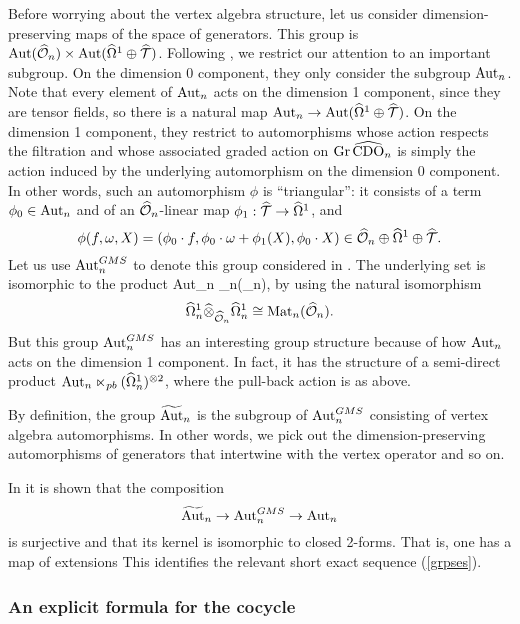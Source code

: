 Before worrying about the vertex algebra structure, let us consider dimension-preserving maps of the space of generators.
This group is $\Aut(\hO_n) \times \Aut(\hOmega^1 \oplus \hT)$.
Following \cite{GMS}, we restrict our attention to an important subgroup.
On the dimension 0 component, they only consider the subgroup $\Aut_n$.
Note that every element of $\Aut_n$ acts on the dimension 1 component, since they are tensor fields,
so there is a natural map $\Aut_n \to \Aut(\hOmega^1 \oplus \hT)$.
On the dimension 1 component, they restrict to automorphisms whose action respects the filtration 
and whose associated graded action on $\Gr\, \hCDO_n$ is simply the action induced by the underlying automorphism on the dimension 0 component.
In other words, such an automorphism $\phi$ is ``triangular'':
it consists of a term $\phi_0 \in \Aut_n$ and of an $\hO_n$-linear map $\phi_1: \hT \to \hOmega^1$,
and 
\[
\phi(f, \omega, X) = (\phi_0 \cdot f, \phi_0 \cdot \omega + \phi_1(X), \phi_0\cdot X) \in \hO_n \oplus \hOmega^1 \oplus \hT.
\]
Let us use $\Aut^{GMS}_n$ to denote this group considered in \cite{GMS}.
The underlying set is isomorphic to the product 
\ben
{\rm Aut}_n _n(\ccO_n),
\een
by using the natural isomorphism 
\[
\hOmega^1_n \widehat{\otimes}_{\hO_n} \hOmega^1_n \cong {\rm Mat}_n(\ccO_n).
\]
But this group $\Aut^{GMS}_n$ has an interesting group structure because of how $\Aut_n$ acts on the dimension 1 component.
In fact, it has the structure of a semi-direct product ${\rm Aut}_n \ltimes_{pb} (\hOmega^1_n)^{\tensor 2}$, where the pull-back action is as above.

By definition, the group $\Tilde{\rm Aut}_n$ is the subgroup of $\Aut^{GMS}_n$ consisting of vertex algebra automorphisms. 
In other words, we pick out the dimension-preserving automorphisms of generators that intertwine with the vertex operator and so on.

In \cite{GMS} it is shown that the composition 
\[
\widetilde{\Aut}_n \to\Aut^{GMS}_n \to \Aut_n
\]
is surjective and that its kernel is isomorphic to closed 2-forms. That is, one has a map of extensions
\ben
{}
\een 
This identifies the relevant short exact sequence (\ref{grpses}). 

\subsubsection{An explicit formula for the cocycle} 
\label{sec GMScocycle}

